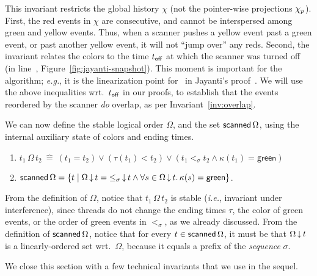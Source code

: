 \documentclass[a4paper,UKenglish]{lipics-v2016}
\newcommand{\ie}{\emph{i.e.}\xspace}
\newcommand{\eg}{\emph{e.g.}\xspace}
\newcommand{\hist}{\chi}
\newcommand{\eqdef}{\mathrel{\:\widehat{=}\:}}
\newcommand{\ldot}{\mathord{.}\,}
\def\ordlist{\sigma}
\newcommand{\E}{\tau}
\newcommand{\C}{\kappa}
\newcommand{\tleq}{\mathrel{\leq_\ordlist}}
\newcommand{\tle}{\mathrel{<_\ordlist}}
\newcommand{\stableorder}{\Omega}
\theoremstyle{definition}
\begin{document}
This invariant restricts the global history $\hist$ (not the
pointer-wise projections $\histp$). First, the red events in $\hist$
are consecutive, and cannot be interspersed among green and yellow
events. Thus, when a scanner pushes a yellow event past a green event,
or past another yellow event, it will not ``jump over'' any
reds. Second, the invariant relates the colors to the time $t_{\mathsf{off}}$ at
which the scanner was turned off (in line~\lineScanUnsetsS,
Figure~\ref{fig:jayanti-snapshot}). This moment is important for the
algorithm; \eg, it is the linearization point for \jyscan~in
Jayanti's proof~\cite{Jayanti+STOC05}.
%
We will use the above inequalities wrt.~$t_{\mathsf{off}}$ in our proofs, to
establish that the events reordered by the scanner \emph{do} overlap,
as per Invariant~\ref{inv:overlap}.

We can now define the stable logical order $\stableorder$, and the set
$\scanned{\stableorder}$, using the internal auxiliary state of colors
and ending times.
%
\begin{definition}[Logical order $\stableorder$ and
    $\scanned{\stableorder}$]\label{def-jleq}
  
\begin{enumerate}
\item $t_1\,{\stableorder}\,t_2 \eqdef (t_1 = t_2) \vee (\E(t_1) <
  t_2) \vee (t_1 \tle t_2 \wedge \C(t_1) = \mathsf{green})$
\item  $\scanned{\stableorder} = \{t \mid \ideal{\stableorder}{t} = \ideal{{\tleq}}{t} \wedge \forall s\in \ideal{\stableorder}{t}\ldot \C(s) = \mathsf{green}\}$.
\end{enumerate}
\end{definition}

From the definition of $\stableorder$, notice that
$t_1\,{\stableorder}\,t_2$ is stable (\ie, invariant under
interference), since threads do not change the ending times $\E$, the
color of green events, or the order of green events in $\tle$, as we
already discussed. 
%
From the definition of $\scanned{\stableorder}$, notice that for every
$t \in \scanned{\stableorder}$, it must be that
$\ideal{\stableorder}{t}$ is a linearly-ordered set
wrt.~$\stableorder$, because it equals a prefix of the \emph{sequence}
$\ordlist$.

We close this section with a few technical invariants that we use in
the sequel.

\end{document}
